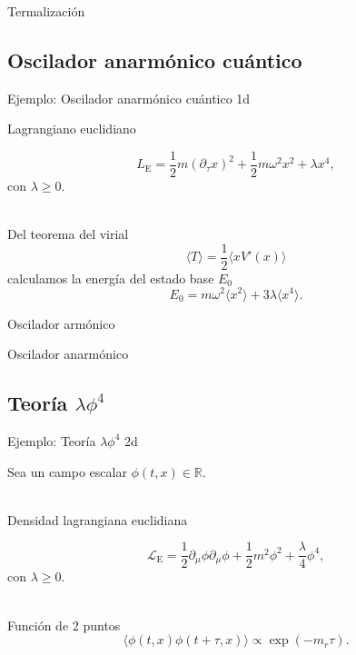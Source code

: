 \documentclass[11pt]{beamer}
\begin{document}
\begin{frame}{Termalización}
\end{frame}

\subsection{Oscilador anarmónico cuántico}
\begin{frame}{Ejemplo: Oscilador anarmónico cuántico 1d}

    Lagrangiano euclidiano

    $$ L_{\text{E}} = \frac{1}{2}m\left(\partial_{\tau}x\right)^2 + \frac{1}{2}m\omega^2 x^2 + \lambda x^4,$$
con $\lambda \ge 0$. \\~

Del teorema del virial 
$$\langle T \rangle = \frac{1}{2}\langle x V'(x) \rangle$$
calculamos la energía del estado base $E_0$ 
$$ E_0 = m\omega^2\langle x^2 \rangle + 3\lambda \langle x^4 \rangle. $$
\end{frame}

\begin{frame}{Oscilador armónico}
\end{frame}

\begin{frame}{Oscilador anarmónico}
\end{frame}

\subsection{Teoría $\lambda \phi^4$}
\begin{frame}{Ejemplo: Teoría $\lambda \phi^4$ 2d}

Sea un campo escalar $\phi(t,x)\in\mathbb{R}$.\\~

Densidad lagrangiana euclidiana

    $$ \mathcal{L}_{\text{E}} = \frac{1}{2}\partial_{\mu} \phi \partial_{\mu}\phi + \frac{1}{2}m^2  \phi^2 + \frac{\lambda}{4} \phi^4,$$
    con $\lambda \ge 0$. \\~
    
	Función de 2 puntos
	$$ \langle \phi(t,x)\phi(t + \tau,x)  \rangle \propto \exp(-m_r \tau).$$    
    
\end{frame}
\end{document}
